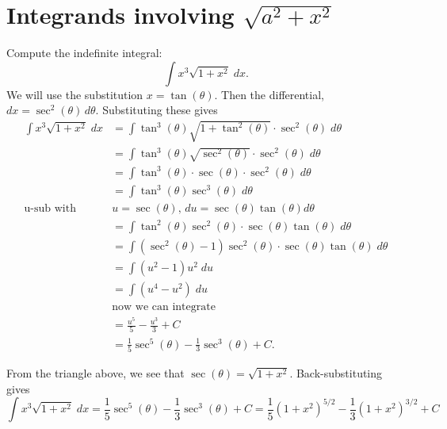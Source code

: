 \documentclass{ximera}
\begin{document}
\section{Integrands involving $\sqrt{a^2 + x^2}$}

\begin{example}
Compute the indefinite integral:
\[
\int x^3\sqrt{1+x^2} \; dx.
\]
We will use the substitution $x = \tan(\theta)$.  Then the differential, 
$dx = \sec^2(\theta) \, d\theta$.  Substituting these gives
\begin{align*}
\int x^3\sqrt{1+x^2} \; dx &= \int \tan^3(\theta) \sqrt{1+\tan^2(\theta)} \cdot \sec^2(\theta) \; d\theta\\
                           &= \int \tan^3(\theta) \sqrt{\sec^2(\theta)} \cdot \sec^2(\theta) \; d\theta\\
                           &= \int \tan^3(\theta) \cdot \sec(\theta) \cdot \sec^2(\theta) \; d\theta\\
                           &= \int \tan^3(\theta) \sec^3(\theta) \; d\theta\\
                           \text{u-sub with } \; & u=\sec(\theta), \, du = \sec(\theta) \tan(\theta) d\theta\\
                           &= \int \tan^2(\theta) \sec^2(\theta) \cdot \sec(\theta) \tan(\theta)\; d\theta\\
                           &= \int \left(\sec^2(\theta)-1 \right) \sec^2(\theta) \cdot \sec(\theta) \tan(\theta)\; d\theta\\ 
                           &= \int (u^2 -1)u^2 \; du\\ 
                           &= \int (u^4 -u^2) \; du\\
                           &\text{now we can integrate}\\
                           &= \frac{u^5}{5} - \frac{u^3}{3} + C\\
                           &= \frac15 \sec^5(\theta)  - \frac13 \sec^3(\theta) + C.
\end{align*}


From the triangle above, we see that $\sec(\theta)= \sqrt{1+x^2}$.  Back-substituting gives
\[
\int x^3\sqrt{1+x^2} \; dx = \frac15 \sec^5(\theta)  - \frac13 \sec^3(\theta) + C = \frac15 (1+x^2)^{5/2}  - \frac13 (1+x^2)^{3/2} + C
\]

\end{example}
\end{document}
